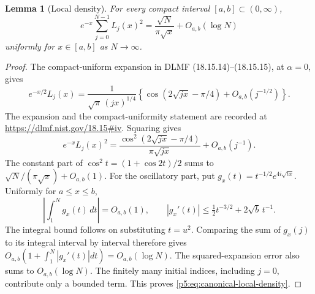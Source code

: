 \documentclass[11pt,a4paper]{article}
\newtheorem{lemma}[theorem]{Lemma}
\theoremstyle{definition}
\theoremstyle{remark}
\numberwithin{equation}{section}
\begin{document}
\begin{lemma}[Local density]\label{p5:lem:canonical-local-density}
For every compact interval $[a,b]\subset(0,\infty)$,
\begin{equation}\label{p5:eq:canonical-local-density}
 e^{-x}\sum_{j=0}^{N-1}L_j(x)^2
   =\frac{\sqrt N}{\pi\sqrt x}+O_{a,b}(\log N)
\end{equation}
uniformly for $x\in[a,b]$ as $N\to\infty$.
\end{lemma}
\begin{proof}
The compact-uniform expansion in DLMF (18.15.14)--(18.15.15),
at $\alpha=0$, gives
\[
 e^{-x/2}L_j(x)=\frac1{\sqrt\pi\,(jx)^{1/4}}
 \left\{\cos(2\sqrt{jx}-\pi/4)+O_{a,b}(j^{-1/2})\right\}.
\]
The expansion and the compact-uniformity statement are recorded at
\url{https://dlmf.nist.gov/18.15#iv}.  Squaring gives
\[
 e^{-x}L_j(x)^2=
 \frac{\cos^2(2\sqrt{jx}-\pi/4)}{\pi\sqrt{jx}}
       +O_{a,b}(j^{-1}).
\]
The constant part of $\cos^2 t=(1+\cos2t)/2$ sums to
$\sqrt N/(\pi\sqrt x)+O_{a,b}(1)$.
For the oscillatory part, put
$g_x(t)=t^{-1/2}e^{4i\sqrt{tx}}$.  Uniformly for $a\leq x\leq b$,
\[
 \left|\int_1^N g_x(t)\,dt\right|=O_{a,b}(1),\qquad
 |g_x'(t)|\leq\tfrac12t^{-3/2}+2\sqrt b\,t^{-1}.
\]
The integral bound follows on substituting $t=u^2$.
Comparing the sum of $g_x(j)$ to its integral interval by interval
therefore gives $O_{a,b}(1+\int_1^N|g_x'(t)|dt)=O_{a,b}(\log N)$.
The squared-expansion error also sums to $O_{a,b}(\log N)$.
The finitely many initial indices, including $j=0$, contribute
only a bounded term.  This proves \eqref{p5:eq:canonical-local-density}.
\end{proof}
\end{document}
